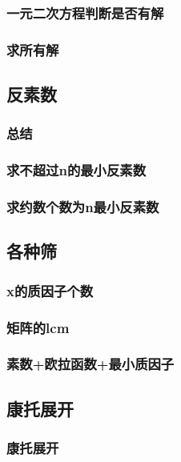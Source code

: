 \documentclass[10pt,a4paper]{article}
\begin{document}
	\subsubsection{一元二次方程判断是否有解}
	
	\subsubsection{求所有解}
	
	\subsection{反素数}
	\subsubsection{总结}
	
	\subsubsection{求不超过n的最小反素数}
	
	\subsubsection{求约数个数为n最小反素数}
	
	\subsection{各种筛}
	\subsubsection{x的质因子个数}
	
	\subsubsection{矩阵的lcm}
	
	\subsubsection{素数+欧拉函数+最小质因子}
	
	\subsection{康托展开}
	\subsubsection{康托展开}
	
\end{document}

